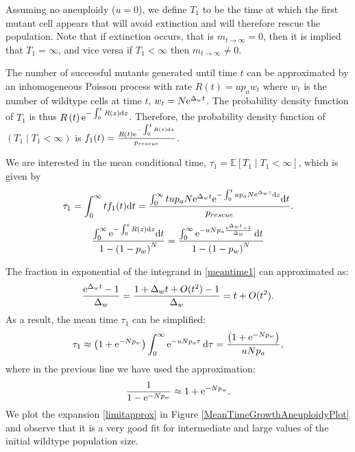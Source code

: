 \documentclass[12pt]{extarticle}
\renewcommand{\d}{{\rm d}}
\newcommand{\e}{{\rm e}}
\begin{document}
Assuming no aneuploidy ($u=0$), we define $T_1$ to be the time at which the first mutant cell appears that will avoid extinction and will therefore rescue the population. Note that if extinction occurs, that is $m_{t\rightarrow\infty}=0$, then it is implied that $T_1=\infty$, and vice versa if $T_1<\infty$ then $m_{t\rightarrow\infty}\neq0$.

The number of successful mutants generated until time $t$ can be approximated by an inhomogeneous Poisson process with rate $R\left(t\right) = u p_a w_t$
where $w_t$ is the number of wildtype cells at time $t$, $w_t=N\e^{\Delta_w t}$.
The probability density function of $T_1$ is thus
$R\left(t\right)\e^{-\int_0^{t}{R(z)\d z}}$.
Therefore, the probability density function of $(T_1 \mid T_1 < \infty)$ is
$f_1(t) = \frac{R\left(t\right)\e^{-\int_0^{t} R(z)\d z}}{p_{rescue}}$. %

We are interested in the mean conditional time, $\tau_1=\mathbb{E}\left[T_1 \mid T_1<\infty\right]$, which is given by
\begin{align}\label{meantime1}
\tau_1 =
\int_{0}^{\infty}{t f_1(t) \d t} = 
\frac{\int_{0}^{\infty}{t u p_a N\e^{\Delta_w t} \e^{-\int_0^{t} u p_a N\e^{\Delta_w z} \d z} \d t}}{p_{rescue}} .
\end{align}
\begin{equation}
\frac{\int_0^\infty\e^{-\int_0^t R(z)\d z}\d t}{1-\left(1-p_w\right)^N}=\frac{\int_0^\infty\e^{-uNp_a\frac{\e^{\Delta_w t}-1}{\Delta_w}}\,\d t}{1-\left(1-p_w\right)^N}
\end{equation}

The fraction in exponential of the integrand in \eqref{meantime1} can approximated as:
\begin{equation*}
\frac{\e^{\Delta_w t}-1}{\Delta_w}=\frac{1+\Delta_w t+O(t^2)-1}{\Delta_w}=t+O(t^2).
\end{equation*}
As a result, the mean time $\tau_1$ can be simplified:
\begin{align}\label{limitapprox}
\tau_1\approx\left(1+\e^{-Np_w}\right)\int_0^\infty\e^{-uNp_a\tau}\,\d\tau=\frac{\left(1+\e^{-Np_w}\right)}{uNp_a},
\end{align}
where in the previous line we have used the approximation:
\begin{equation*}
\frac{1}{1-\e^{-Np_w}}\approx1+\e^{-Np_w}.
\end{equation*}
We plot the expansion \eqref{limitapprox} in Figure \ref{MeanTimeGrowthAneuploidyPlot} and observe that it is a very good fit for intermediate and large values of the initial wildtype population size.
\end{document}
